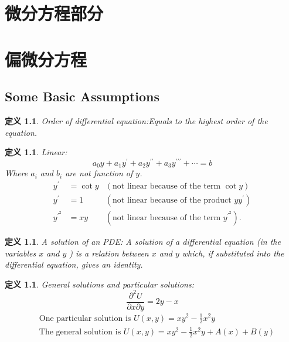 \documentclass[10pt, a4paper, oneside]{ctexbook}
\newtheorem{definition}[theorem]{定义}
\begin{document}
\chapter*{微分方程部分}
\chapter{偏微分方程}
\section{Some Basic Assumptions}
\begin{definition}
    Order of differential equation:\rm  Equals to the highest order of the equation.
\end{definition}
\begin{definition}
    Linear: \rm
    \begin{equation*}
        a_{0} y+a_{1} y^{\prime}+a_{2} y^{\prime \prime}+a_{3} y^{\prime \prime \prime}+\cdots=b
    \end{equation*}
    Where $a_i$ and $b_i$ are not function of $y$.
    \begin{equation*}
        \begin{aligned}
            y^{\prime}     & =\cot y & (\text {not linear because of the term } \cot y)                     \\
            y^{\prime}     & =1      & \left(\text {not linear because of the product } y y^{\prime}\right) \\
            y^{\prime^{2}} & =x y    & (\text {not linear because of the term } y^{\prime^{2}}) .
        \end{aligned}
    \end{equation*}
\end{definition}
\begin{definition}
    A solution of an PDE: \rm
    A solution of a differential equation (in the variables $x$ and $y$ ) is a relation between $x$ and $y$ which, if substituted into the differential equation, gives an identity.
\end{definition}
\begin{definition}
    General solutions and particular solutions: \rm
    $$\frac{\partial^{2} U}{\partial x \partial y}=2 y-x$$
    $$
        \begin{aligned}
             & \text { One particular solution is } U(x, y)=x y^{2}-\frac{1}{2} x^{2} y          \\
             & \text { The general solution is } U(x, y)=x y^{2}-\frac{1}{2} x^{2} y+A(x) + B(y)
        \end{aligned}
    $$
\end{definition}
\end{document}

